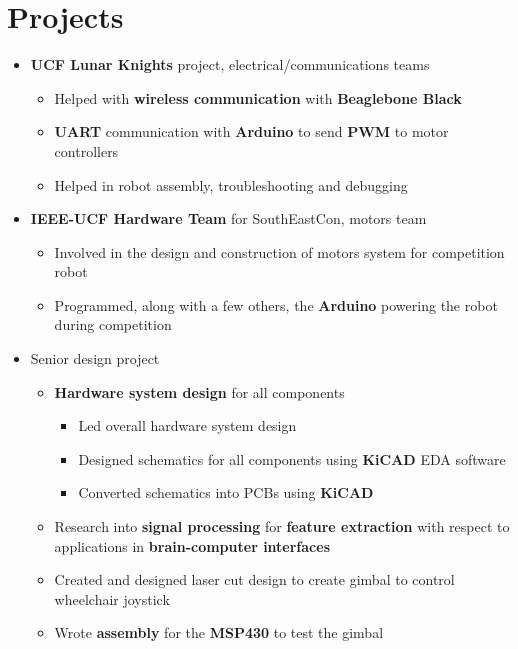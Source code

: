 \documentclass{my_resume}
\begin{document}
\section{Projects}
\begin{itemize}
    \item \textbf{UCF Lunar Knights} project, electrical/communications teams
        \begin{itemize}
            \item Helped with \textbf{wireless communication} with
                \textbf{Beaglebone Black}
            \item \textbf{UART} communication with \textbf{Arduino} to send
                \textbf{PWM} to motor controllers
            \item Helped in robot assembly, troubleshooting and debugging
        \end{itemize}
    \item \textbf{IEEE-UCF Hardware Team} for SouthEastCon, motors team
        \begin{itemize}
            \item Involved in the design and construction of motors system for
                competition robot
            \item Programmed, along with a few others, the \textbf{Arduino}
                powering the robot during competition
        \end{itemize}
    \item Senior design project
        \begin{itemize}
            \item \textbf{Hardware system design} for all components
            \begin{itemize}
                \item Led overall hardware system design
                \item Designed schematics for all components using \textbf{KiCAD} EDA software
                \item Converted schematics into PCBs using \textbf{KiCAD}
            \end{itemize}
            \item Research into \textbf{signal processing} for \textbf{feature extraction}
                with respect to applications in \textbf{brain-computer interfaces}
            \item Created and designed laser cut design to create gimbal to control wheelchair joystick
            \item Wrote \textbf{assembly} for the \textbf{MSP430} to test the gimbal
        \end{itemize}

\end{itemize}
\end{document}
